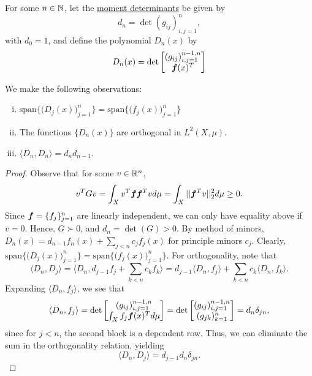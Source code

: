 \begin{definition}\label{def:moments}\normalfont
For some $n\in\mathbb{N}$, let the \underline{moment determinants} be given by
\begin{equation} 
d_n = \det{(g_{ij})_{i,j=1}^n},
\end{equation} 
with $d_0=1$, and define the polynomial $D_n(x)$ by
\begin{equation}
D_n(x) = \det{
	\begin{bmatrix} (g_{ij})_{i,j = 1}^{n-1,n} \\ \boldsymbol{f}(x)^T  \end{bmatrix}} 
\end{equation}
\end{definition}

\begin{proposition}\label{prop:moments}\normalfont
We make the following observations:
\begin{enumerate}[(i)]
	\item $\text{span}\{\big(D_j(x)\big)_{j=1}^n\} = \text{span}\{\big(f_j(x)\big)_{j=1}^n\}$
	\item The functions $\{D_n(x)\}$ are orthogonal in $L^2(X,\mu)$.
	\item $\langle D_n,D_n\rangle = d_nd_{n-1}$.
\end{enumerate}
\end{proposition}
\begin{proof}
Observe that for some $v \in \mathbb{R}^n$,
$$ v^T G v = \int_{X} v^T \boldsymbol{f}\boldsymbol{f}^T v d\mu = \int_{X} ||\boldsymbol{f}^Tv||_2^2 d\mu \geq 0.$$
Since $\boldsymbol{f} = \{f_j\}_{j=1}^n$ are linearly independent, we can only have equality above if $v = 0$. Hence, $G \succ 0$, and $d_n = \det(G) > 0$. By method of minors, $D_n(x) = d_{n-1}f_n(x) + \sum_{j < n} c_j f_j(x)$ for principle minors $c_j$. Clearly, $\text{span}\{\big(D_j(x)\big)_{j=1}^n\} = \text{span}\{\big(f_j(x)\big)_{j=1}^n\}$. For orthogonality, note that $$\big\langle D_n,D_j\big\rangle = \big\langle D_n, d_{j-1}f_j + \sum_{k<n} c_k f_k\big\rangle = d_{j-1}\big\langle D_n,f_j\big\rangle+ \sum_{k<n}c_k\big\langle D_n,f_k\big\rangle.$$ Expanding $\langle D_n,f_j\rangle$, we see that $$\langle D_n,f_j\rangle = \det{
	\begin{bmatrix} (g_{ij})_{i,j = 1}^{n-1,n} \\ \int_{X}f_j\boldsymbol{f}(x)^Td\mu  \end{bmatrix}} = \det{
\begin{bmatrix} (g_{ij})_{i,j = 1}^{n-1,n} \\ (g_{jk})_{k=1}^n \end{bmatrix}} = d_n\delta_{jn},$$
since for $j < n$, the second block is a dependent row. Thus, we can eliminate the sum in the orthogonality relation, yielding $$\langle D_n,D_j\rangle = d_{j-1}d_n\delta_{jn}.$$
\end{proof}
